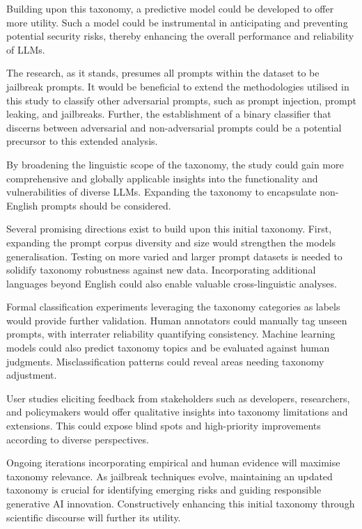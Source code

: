 \documentclass[
  letterpaper,
  DIV=11,
  numbers=noendperiod]{scrartcl}
\begin{document}
Building upon this taxonomy, a predictive model could be developed to
offer more utility. Such a model could be instrumental in anticipating
and preventing potential security risks, thereby enhancing the overall
performance and reliability of LLMs.

The research, as it stands, presumes all prompts within the dataset to
be jailbreak prompts. It would be beneficial to extend the methodologies
utilised in this study to classify other adversarial prompts, such as
prompt injection, prompt leaking, and jailbreaks. Further, the
establishment of a binary classifier that discerns between adversarial
and non-adversarial prompts could be a potential precursor to this
extended analysis.

By broadening the linguistic scope of the taxonomy, the study could gain
more comprehensive and globally applicable insights into the
functionality and vulnerabilities of diverse LLMs. Expanding the
taxonomy to encapsulate non-English prompts should be considered.

Several promising directions exist to build upon this initial taxonomy.
First, expanding the prompt corpus diversity and size would strengthen
the models generalisation. Testing on more varied and larger prompt
datasets is needed to solidify taxonomy robustness against new data.
Incorporating additional languages beyond English could also enable
valuable cross-linguistic analyses.

Formal classification experiments leveraging the taxonomy categories as
labels would provide further validation. Human annotators could manually
tag unseen prompts, with interrater reliability quantifying consistency.
Machine learning models could also predict taxonomy topics and be
evaluated against human judgments. Misclassification patterns could
reveal areas needing taxonomy adjustment.

User studies eliciting feedback from stakeholders such as developers,
researchers, and policymakers would offer qualitative insights into
taxonomy limitations and extensions. This could expose blind spots and
high-priority improvements according to diverse perspectives.

Ongoing iterations incorporating empirical and human evidence will
maximise taxonomy relevance. As jailbreak techniques evolve, maintaining
an updated taxonomy is crucial for identifying emerging risks and
guiding responsible generative AI innovation. Constructively enhancing
this initial taxonomy through scientific discourse will further its
utility.
\end{document}
